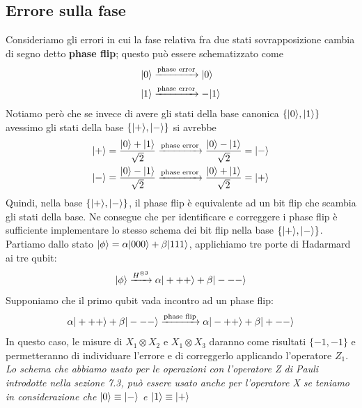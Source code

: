 \documentclass[12pt, a4paper]{report}
\begin{document}
\subsection{Errore sulla fase}
Consideriamo gli errori in cui la fase relativa fra due stati sovrapposizione cambia di segno detto \textbf{phase flip}; questo può essere schematizzato come
\begin{equation*}
    \begin{split}
        | 0 \rangle &\xrightarrow{\text{phase error}} | 0 \rangle \\
        | 1 \rangle &\xrightarrow{\text{phase error}} -| 1 \rangle
    \end{split}
\end{equation*}
Notiamo però che se invece di avere gli stati della base canonica $\{| 0 \rangle,| 1 \rangle\}$ avessimo gli stati della base $\{| + \rangle,| - \rangle\}$ si avrebbe
\begin{equation*}
    \begin{split}
        | + \rangle=\frac{| 0 \rangle+| 1 \rangle}{\sqrt{2}} &\xrightarrow{\text{phase error}}  \frac{| 0 \rangle-| 1 \rangle}{\sqrt{2}} = | - \rangle\\
        | - \rangle=\frac{| 0 \rangle-| 1 \rangle}{\sqrt{2}} &\xrightarrow{\text{phase error}} \frac{| 0 \rangle+| 1 \rangle}{\sqrt{2}} = | + \rangle
    \end{split}
\end{equation*}
Quindi, nella base $\{| + \rangle,| - \rangle\}$, il phase flip è equivalente ad un bit flip che scambia gli stati della base. Ne consegue che per identificare e correggere i phase flip è sufficiente implementare lo stesso schema dei bit flip nella base $\{| + \rangle,| - \rangle\}$.\\
Partiamo dallo stato $| \phi \rangle=\alpha| 000 \rangle+\beta| 111 \rangle$, applichiamo tre porte di Hadarmard ai tre qubit:
\begin{equation*}
    | \phi \rangle\xrightarrow{H^{\otimes 3}}\alpha| +++ \rangle+\beta| --- \rangle
\end{equation*}
Supponiamo che il primo qubit vada incontro ad un phase flip:
\begin{equation*}
    \alpha| +++ \rangle+\beta| --- \rangle\xrightarrow{\text{phase flip}} \alpha| -++ \rangle+\beta| +-- \rangle
\end{equation*}
In questo caso, le misure di $X_{1}\otimes X_{2}$ e $X_{1}\otimes X_{3}$ daranno come risultati $\{-1,-1\}$ e permetteranno di individuare l'errore e di correggerlo applicando l'operatore $Z_{1}$.\\
\textit{Lo schema che abbiamo usato per le operazioni con l'operatore Z di Pauli introdotte nella sezione 7.3, può essere usato anche per l'operatore X se teniamo in considerazione che $| 0 \rangle\equiv | - \rangle$ e $| 1 \rangle\equiv | + \rangle$}
\end{document}
